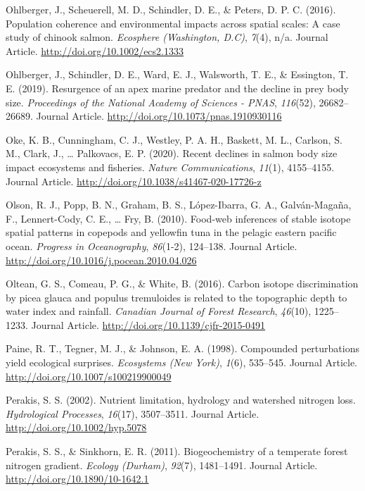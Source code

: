 \documentclass [11pt, proquest] {uwthesis}[2015/03/03]
\begin{document}
\hypertarget{ref-Ohlberger2016}{}
Ohlberger, J., Scheuerell, M. D., Schindler, D. E., \& Peters, D. P. C.
(2016). Population coherence and environmental impacts across spatial
scales: A case study of chinook salmon. \emph{Ecosphere (Washington,
D.C)}, \emph{7}(4), n/a. Journal Article.
\url{http://doi.org/10.1002/ecs2.1333}

\hypertarget{ref-Ohlberger2019}{}
Ohlberger, J., Schindler, D. E., Ward, E. J., Walsworth, T. E., \&
Essington, T. E. (2019). Resurgence of an apex marine predator and the
decline in prey body size. \emph{Proceedings of the National Academy of
Sciences - PNAS}, \emph{116}(52), 26682--26689. Journal Article.
\url{http://doi.org/10.1073/pnas.1910930116}

\hypertarget{ref-Oke2020}{}
Oke, K. B., Cunningham, C. J., Westley, P. A. H., Baskett, M. L.,
Carlson, S. M., Clark, J., \ldots{} Palkovacs, E. P. (2020). Recent
declines in salmon body size impact ecosystems and fisheries.
\emph{Nature Communications}, \emph{11}(1), 4155--4155. Journal Article.
\url{http://doi.org/10.1038/s41467-020-17726-z}

\hypertarget{ref-Olson2010}{}
Olson, R. J., Popp, B. N., Graham, B. S., López-Ibarra, G. A.,
Galván-Magaña, F., Lennert-Cody, C. E., \ldots{} Fry, B. (2010).
Food-web inferences of stable isotope spatial patterns in copepods and
yellowfin tuna in the pelagic eastern pacific ocean. \emph{Progress in
Oceanography}, \emph{86}(1-2), 124--138. Journal Article.
\url{http://doi.org/10.1016/j.pocean.2010.04.026}

\hypertarget{ref-Oltean2016}{}
Oltean, G. S., Comeau, P. G., \& White, B. (2016). Carbon isotope
discrimination by picea glauca and populus tremuloides is related to the
topographic depth to water index and rainfall. \emph{Canadian Journal of
Forest Research}, \emph{46}(10), 1225--1233. Journal Article.
\url{http://doi.org/10.1139/cjfr-2015-0491}

\hypertarget{ref-Paine1998}{}
Paine, R. T., Tegner, M. J., \& Johnson, E. A. (1998). Compounded
perturbations yield ecological surprises. \emph{Ecosystems (New York)},
\emph{1}(6), 535--545. Journal Article.
\url{http://doi.org/10.1007/s100219900049}

\hypertarget{ref-Perakis2002}{}
Perakis, S. S. (2002). Nutrient limitation, hydrology and watershed
nitrogen loss. \emph{Hydrological Processes}, \emph{16}(17), 3507--3511.
Journal Article. \url{http://doi.org/10.1002/hyp.5078}

\hypertarget{ref-Perakis2011}{}
Perakis, S. S., \& Sinkhorn, E. R. (2011). Biogeochemistry of a
temperate forest nitrogen gradient. \emph{Ecology (Durham)},
\emph{92}(7), 1481--1491. Journal Article.
\url{http://doi.org/10.1890/10-1642.1}
\end{document}
